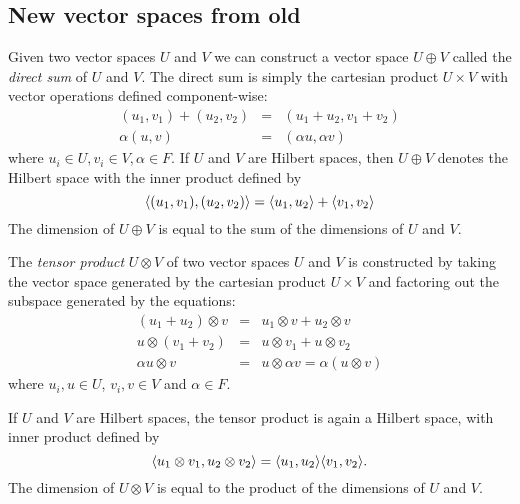 \documentclass[12pt]{report}
\begin{document}
\subsection{New vector spaces from old}
\begin{defn}
Given two vector spaces $U$ and $V$ we can construct a vector space $U \oplus V$ called the \emph{direct sum} of $U$ and $V$. The direct sum is simply the cartesian product $U \times V$ with vector operations defined component-wise:
\begin{eqnarray*}
(u_1,v_1) + (u_2,v_2) & = & (u_1+u_2,v_1+v_2)\\
\alpha(u,v) & = & (\alpha u, \alpha v)
\end{eqnarray*}
where $u_i \in U, v_i \in V, \alpha \in F$. If $U$ and $V$ are Hilbert spaces, then $U \oplus V$ denotes the Hilbert space with the inner product defined by
$$\langle (u_1,v_1), (u_2,v_2) \rangle = \langle u_1, u_2 \rangle + \langle v_1, v_2 \rangle$$
The dimension of $U\oplus V$ is equal to the sum of the dimensions of $U$ and $V$.
\end{defn}
\begin{defn}

The \emph{tensor product} $U \otimes V$ of two vector spaces $U$ and $V$ is constructed by taking the vector space generated by the cartesian product $U \times V$ and factoring out the subspace generated by the equations:
\begin{eqnarray*}
(u_1 + u_2) \otimes v & = & u_1 \otimes v + u_2 \otimes v\\
u \otimes (v_1 + v_2) & = & u \otimes v_1 + u \otimes v_2\\
\alpha u\otimes v & =  &u \otimes \alpha v = \alpha(u \otimes v) 
\end{eqnarray*}
where $u_i,u \in U$, $v_i,v \in V$ and $\alpha \in F$.

If $U$ and $V$ are Hilbert spaces, the tensor product is again a Hilbert space, with inner product defined by
$$\langle u_1\otimes v_1, u_2 \otimes v_2 \rangle = \langle u_1, u_2 \rangle\langle v_1, v_2 \rangle.$$
The dimension of $U \otimes V$ is equal to the product of the dimensions of $U$ and $V$.
\end{defn}
\end{document}
